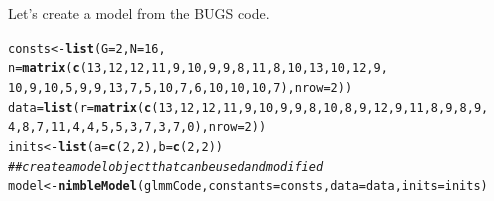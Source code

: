 \documentclass{beamer}\usepackage[]{graphicx}\usepackage[]{color}
\makeatletter
\newcommand{\hlnum}[1]{\textcolor[rgb]{0.686,0.059,0.569}{#1}}%
\newcommand{\hlcom}[1]{\textcolor[rgb]{0.678,0.584,0.686}{\textit{#1}}}%
\newcommand{\hlstd}[1]{\textcolor[rgb]{0.345,0.345,0.345}{#1}}%
\newcommand{\hlkwb}[1]{\textcolor[rgb]{0.69,0.353,0.396}{#1}}%
\newcommand{\hlkwc}[1]{\textcolor[rgb]{0.333,0.667,0.333}{#1}}%
\newcommand{\hlkwd}[1]{\textcolor[rgb]{0.737,0.353,0.396}{\textbf{#1}}}%
\newenvironment{kframe}{%
 \def\at@end@of@kframe{}%
 \ifinner\ifhmode%
  \def\at@end@of@kframe{\end{minipage}}%
  \begin{minipage}{\columnwidth}%
 \fi\fi%
 \def\FrameCommand##1{\hskip\@totalleftmargin \hskip-\fboxsep
 \colorbox{shadecolor}{##1}\hskip-\fboxsep
     \hskip-\linewidth \hskip-\@totalleftmargin \hskip\columnwidth}%
 \MakeFramed {\advance\hsize-\width
   \@totalleftmargin\z@ \linewidth\hsize
   \@setminipage}}%
 {\par\unskip\endMakeFramed%
 \at@end@of@kframe}
\newenvironment{knitrout}{}{} %
\makeatother
\begin{document}
\begin{frame}[fragile]
{Let's create a model from the BUGS code.
}
\begin{knitrout}\scriptsize
{}\color{fgcolor}\begin{kframe}
\begin{alltt}
\hlstd{consts} \hlkwb{<-} \hlkwd{list}\hlstd{(}\hlkwc{G} \hlstd{=} \hlnum{2}\hlstd{,} \hlkwc{N} \hlstd{=} \hlnum{16}\hlstd{,}
     \hlkwc{n} \hlstd{=} \hlkwd{matrix}\hlstd{(}\hlkwd{c}\hlstd{(}\hlnum{13}\hlstd{,}\hlnum{12}\hlstd{,}\hlnum{12}\hlstd{,}\hlnum{11}\hlstd{,}\hlnum{9}\hlstd{,}\hlnum{10}\hlstd{,}\hlnum{9}\hlstd{,}\hlnum{9}\hlstd{,}\hlnum{8}\hlstd{,}\hlnum{11}\hlstd{,}\hlnum{8}\hlstd{,}\hlnum{10}\hlstd{,}\hlnum{13}\hlstd{,}\hlnum{10}\hlstd{,}\hlnum{12}\hlstd{,}\hlnum{9}\hlstd{,}
           \hlnum{10}\hlstd{,}\hlnum{9}\hlstd{,}\hlnum{10}\hlstd{,}\hlnum{5}\hlstd{,}\hlnum{9}\hlstd{,}\hlnum{9}\hlstd{,}\hlnum{13}\hlstd{,}\hlnum{7}\hlstd{,}\hlnum{5}\hlstd{,}\hlnum{10}\hlstd{,}\hlnum{7}\hlstd{,}\hlnum{6}\hlstd{,}\hlnum{10}\hlstd{,}\hlnum{10}\hlstd{,}\hlnum{10}\hlstd{,}\hlnum{7}\hlstd{),} \hlkwc{nrow} \hlstd{=} \hlnum{2}\hlstd{))}
\hlstd{data} \hlkwb{=} \hlkwd{list}\hlstd{(}\hlkwc{r} \hlstd{=} \hlkwd{matrix}\hlstd{(}\hlkwd{c}\hlstd{(}\hlnum{13}\hlstd{,}\hlnum{12}\hlstd{,}\hlnum{12}\hlstd{,}\hlnum{11}\hlstd{,}\hlnum{9}\hlstd{,}\hlnum{10}\hlstd{,}\hlnum{9}\hlstd{,}\hlnum{9}\hlstd{,}\hlnum{8}\hlstd{,}\hlnum{10}\hlstd{,}\hlnum{8}\hlstd{,}\hlnum{9}\hlstd{,} \hlnum{12}\hlstd{,}\hlnum{9}\hlstd{,}\hlnum{11}\hlstd{,}\hlnum{8}\hlstd{,}\hlnum{9}\hlstd{,}\hlnum{8}\hlstd{,}\hlnum{9}\hlstd{,}
                         \hlnum{4}\hlstd{,}\hlnum{8}\hlstd{,}\hlnum{7}\hlstd{,}\hlnum{11}\hlstd{,}\hlnum{4}\hlstd{,}\hlnum{4}\hlstd{,}\hlnum{5}\hlstd{,}\hlnum{5}\hlstd{,}\hlnum{3}\hlstd{,}\hlnum{7}\hlstd{,}\hlnum{3}\hlstd{,}\hlnum{7}\hlstd{,}\hlnum{0}\hlstd{),} \hlkwc{nrow} \hlstd{=} \hlnum{2}\hlstd{))}
\hlstd{inits} \hlkwb{<-} \hlkwd{list}\hlstd{(}\hlkwc{a} \hlstd{=} \hlkwd{c}\hlstd{(}\hlnum{2}\hlstd{,} \hlnum{2}\hlstd{),} \hlkwc{b} \hlstd{=} \hlkwd{c}\hlstd{(}\hlnum{2}\hlstd{,} \hlnum{2}\hlstd{))}
\hlcom{## create a model object that can be used and modified}
\hlstd{model} \hlkwb{<-} \hlkwd{nimbleModel}\hlstd{(glmmCode,} \hlkwc{constants} \hlstd{= consts,} \hlkwc{data} \hlstd{= data,} \hlkwc{inits} \hlstd{= inits)}
\end{alltt}
\end{kframe}
\end{knitrout}

\end{frame}
\end{document}
